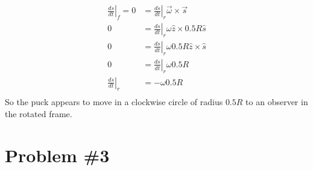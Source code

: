 \documentclass[11pt]{article}
\numberwithin{equation}{section}
\begin{document}
\begin{enumerate}[(a)]
\begin{align*}
\left.\frac{ds}{dt}\right|_f = 0 &= \left.\frac{ds}{dt}\right|_r \vec{\omega}\times\vec{s}\\
0 &= \left.\frac{ds}{dt}\right|_r \omega\hat{z}\times 0.5R\hat{s}\\
0 &= \left.\frac{ds}{dt}\right|_r \omega0.5R\hat{z}\times\hat{s}\\
0 &= \left.\frac{ds}{dt}\right|_r \omega0.5R\\
\left.\frac{ds}{dt}\right|_r &= -\omega0.5R\\
\end{align*}
So the puck appears to move in a clockwise circle of radius $0.5R$ to an observer in the rotated frame.
\end{enumerate}

\section{Problem \#3}
\end{document}
